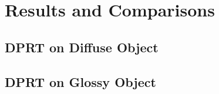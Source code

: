 \section{Results and Comparisons}

\subsection{DPRT on Diffuse Object}

\subsection{DPRT on Glossy Object}
